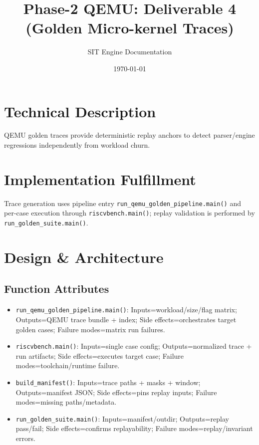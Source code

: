 \documentclass[11pt,a4paper]{article}
\title{Phase-2 QEMU: Deliverable 4 (Golden Micro-kernel Traces)}
\author{SIT Engine Documentation}
\date{\today}
\begin{document}
\maketitle

\section{Technical Description}
QEMU golden traces provide deterministic replay anchors to detect parser/engine regressions independently from workload churn.

\section{Implementation Fulfillment}
Trace generation uses pipeline entry \texttt{run\_qemu\_golden\_pipeline.main()} and per-case execution through \texttt{riscvbench.main()}; replay validation is performed by \texttt{run\_golden\_suite.main()}.

\section{Design \& Architecture}
\subsection*{Function Attributes}
\begin{itemize}[leftmargin=*]
  \item \texttt{run\_qemu\_golden\_pipeline.main()}: Inputs=workload/size/flag matrix; Outputs=QEMU trace bundle + index; Side effects=orchestrates target golden cases; Failure modes=matrix run failures.
  \item \texttt{riscvbench.main()}: Inputs=single case config; Outputs=normalized trace + run artifacts; Side effects=executes target case; Failure modes=toolchain/runtime failure.
  \item \texttt{build\_manifest()}: Inputs=trace paths + masks + window; Outputs=manifest JSON; Side effects=pins replay inputs; Failure modes=missing paths/metadata.
  \item \texttt{run\_golden\_suite.main()}: Inputs=manifest/outdir; Outputs=replay pass/fail; Side effects=confirms replayability; Failure modes=replay/invariant errors.
\end{itemize}
\end{document}
